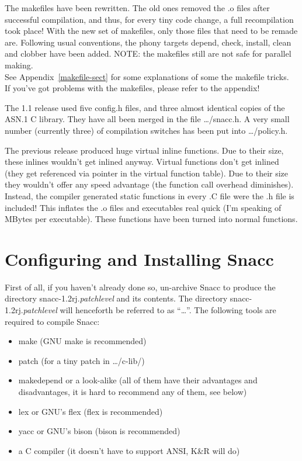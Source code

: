 The makefiles have been rewritten.
The old ones removed the {\ufn .o} files after successful compilation, and thus, for every tiny code change, a full recompilation took place!
With the new set of makefiles, only those files that need to be remade are.
Following usual conventions, the phony targets depend, check, install, clean and clobber have been added.
\newline
NOTE: the makefiles still are not safe for parallel making.
\\
See Appendix~\ref{makefile-sect} for some explanations of some the makefile tricks.
\\
If you've got problems with the makefiles, please refer to the appendix!

The 1.1 release used five config.h files, and three almost identical copies of the ASN.1 C library.
They have all been merged in the file {\ufn \dots/snacc.h}.
A very small number (currently three) of compilation switches has been put into {\ufn \dots/policy.h}.

The previous release produced huge virtual inline functions.
Due to their size, these inlines wouldn't get inlined anyway.
Virtual functions don't get inlined (they get referenced via pointer in the virtual function table).
Due to their size they wouldn't offer any speed advantage (the function call overhead diminishes).
Instead, the compiler generated static functions in every {\ufn .C} file were the {\ufn .h} file is included!
This inflates the {\ufn .o} files and executables real quick (I'm speaking of MBytes per executable).
These functions have been turned into normal functions.

\section{\label{install-section}Configuring and Installing Snacc}

First of all, if you haven't already done so, un-archive Snacc to
produce the directory {\ufn snacc-1.2rj.\textit{patchlevel}} and its contents.
The directory {\ufn snacc-1.2rj.\textit{patchlevel}} will henceforth be referred to as ``{\ufn \dots}''.
The following tools are required to compile Snacc:
\begin{itemize}
  \item {\ufn make} (GNU {\ufn make} is recommended)
  \item {\ufn patch} (for a tiny patch in {\ufn \dots/c-lib/})
  \item {\ufn makedepend} or a look-alike (all of them have their advantages and disadvantages, it is hard to recommend any of them, see below)
  \item {\ufn lex} or GNU's {\ufn flex} ({\ufn flex} is recommended)
  \item {\ufn yacc} or GNU's {\ufn bison} ({\ufn bison} is recommended)
  \item a C compiler (it doesn't have to support ANSI, K\&R will do)
\end{itemize}

